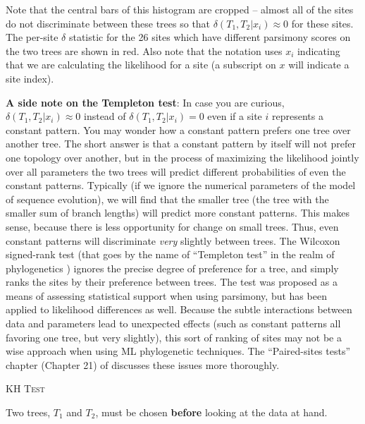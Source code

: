 \documentclass[11pt]{article}
\renewcommand{\section}[2]{%
\bigskip
\begin{center}
\begin{Large}
\normalfont\scshape #2
\medskip
\end{Large}
\end{center}}
\renewcommand{\subsubsection}[1]{%
\noindent\textbf{#1}:}
\begin{document}
Note that the central bars of this histogram are cropped -- almost all of the sites do not discriminate between these trees so that $\delta(T_1,T_2|x_i)\approx0$ for these sites.
The per-site $\delta$ statistic for the 26 sites which have different parsimony scores on the two trees are shown in red.
Also note that the notation uses $x_i$ indicating that we are calculating the likelihood for a site (a subscript on $x$ will indicate a site index).  

\subsubsection{A side note on the Templeton test} In case you are curious, $\delta(T_1,T_2|x_i)\approx0$ instead of $\delta(T_1,T_2|x_i)=0$ even if a site $i$ represents a constant pattern.
You may wonder how a constant pattern prefers one tree over another tree.
The short answer is that a constant pattern by itself will not prefer one topology over another, but in the process of maximizing the likelihood jointly over all parameters the two trees will predict different probabilities of even the constant patterns.
Typically (if we ignore the numerical parameters of the model of sequence evolution), we will find that the smaller tree (the tree with the smaller sum of branch lengths) will predict more constant patterns.
This makes sense, because there is less opportunity for change on small trees.
Thus, even constant patterns will discriminate {\em very} slightly between trees.
The Wilcoxon signed-rank test (that goes by the name of ``Templeton test'' in the realm of phylogenetics \citep{Templeton1983}) ignores the precise degree of preference for a tree, and simply ranks the sites by their preference between trees.
The test was proposed as a means of assessing statistical support when using parsimony, but has been applied to likelihood differences as well.
Because the subtle interactions between data and parameters lead to unexpected effects (such as constant patterns all favoring one tree, but very slightly), this sort of ranking of sites may not be a wise approach when using ML phylogenetic techniques.
The ``Paired-sites tests'' chapter (Chapter 21) of \citep{Felsenstein2004} discusses these issues more thoroughly.


\newpage
\section*{KH Test \citep{KishinoH1989} }
Two trees, $T_1$ and $T_2$, must be chosen {\bf before} looking at the data at hand.
\end{document}
